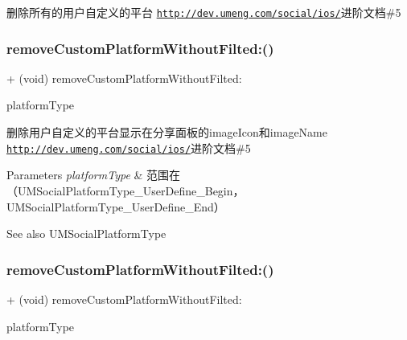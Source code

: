 删除所有的用户自定义的平台 \href{http://dev.umeng.com/social/ios/}{\tt http\+://dev.\+umeng.\+com/social/ios/}进阶文档\#5 \mbox{\label{interface_u_m_social_u_i_manager_ab914751a51259412e5b4a50bdc0b6506}} 
\subsubsection{\texorpdfstring{remove\+Custom\+Platform\+Without\+Filted\+:()}{removeCustomPlatformWithoutFilted:()}\hspace{0.1cm}{\footnotesize\ttfamily [1/2]}}
{\footnotesize\ttfamily + (void) remove\+Custom\+Platform\+Without\+Filted\+: \begin{DoxyParamCaption}\item[{(U\+M\+Social\+Platform\+Type)}]{platform\+Type }\end{DoxyParamCaption}}

删除用户自定义的平台显示在分享面板的image\+Icon和image\+Name \href{http://dev.umeng.com/social/ios/}{\tt http\+://dev.\+umeng.\+com/social/ios/}进阶文档\#5


\begin{DoxyParams}{Parameters}
{\em platform\+Type} & 范围在（\+U\+M\+Social\+Platform\+Type\+\_\+\+User\+Define\+\_\+\+Begin，\+U\+M\+Social\+Platform\+Type\+\_\+\+User\+Define\+\_\+\+End） \\
\hline
\end{DoxyParams}
\begin{DoxySeeAlso}{See also}
U\+M\+Social\+Platform\+Type 
\end{DoxySeeAlso}
\mbox{\label{interface_u_m_social_u_i_manager_ab914751a51259412e5b4a50bdc0b6506}} 
\subsubsection{\texorpdfstring{remove\+Custom\+Platform\+Without\+Filted\+:()}{removeCustomPlatformWithoutFilted:()}\hspace{0.1cm}{\footnotesize\ttfamily [2/2]}}
{\footnotesize\ttfamily + (void) remove\+Custom\+Platform\+Without\+Filted\+: \begin{DoxyParamCaption}\item[{(U\+M\+Social\+Platform\+Type)}]{platform\+Type }\end{DoxyParamCaption}}

